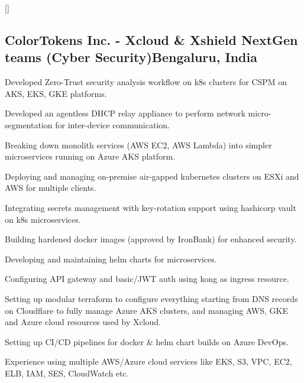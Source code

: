 \documentclass[letter,10pt]{article}
\begin{document}
\titlespacing*{\subsubsection}{0em}{0em}{0em}
\titleformat{\subsubsection}{\itshape}{}{0em}{}[]


\subsection{ColorTokens Inc. - Xcloud \& Xshield NextGen teams (Cyber Security)\hfill Bengaluru, India}
\begin{zitemize}
\item Developed Zero-Trust security analysis workflow on k8s clusters for CSPM on AKS, EKS, GKE platforms.
\item Developed an agentless DHCP relay appliance to perform network micro-segmentation for inter-device communication.
\item Breaking down monolith services (AWS EC2, AWS Lambda) into simpler microservices running on Azure AKS platform.
\item Deploying and managing on-premise air-gapped kubernetes clusters on ESXi and AWS for multiple clients.
\item Integrating secrets management with key-rotation support using hashicorp vault on k8s microservices.
\item Building hardened docker images (approved by IronBank) for enhanced security.
\item Developing and maintaining helm charts for microservices.
\item Configuring API gateway and basic/JWT auth using kong as ingress resource.
\item Setting up modular terraform to configure everything starting from DNS records on Cloudflare to fully  manage Azure AKS clusters, and managing AWS, GKE and Azure cloud resources used by Xcloud.
\item Setting up CI/CD pipelines for docker \& helm chart builds on Azure DevOps.
\item Experience using multiple AWS/Azure cloud services like EKS, S3, VPC, EC2, ELB, IAM, SES, CloudWatch etc.
\end{zitemize}
\end{document}
